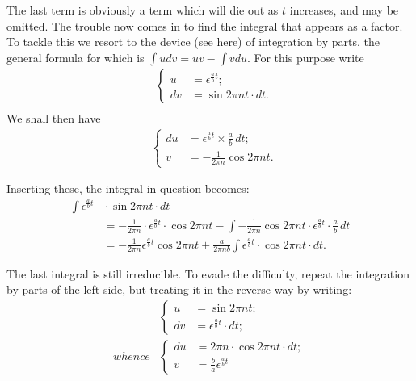 \documentclass{ximera}
\begin{document}
The last term is obviously a term which will die
out as $t$ increases, and may be omitted. The trouble
now comes in to find the integral that appears as a
factor. To tackle this we resort to the device (see
here) of integration by parts, the general formula for
which is $\int u dv = uv - \int v du$. For this purpose write
\begin{align*}
&\left\{
\begin{aligned}
 u &= \epsilon^{\frac{a}{b} t}; \\
dv &= \sin 2\pi nt · dt.
\end{aligned}
\right.  \\
\end{align*}
We shall then have
\begin{align*}
&\left\{
\begin{aligned}
du &= \epsilon^{\frac{a}{b} t} × \frac{a}{b}\, dt; \\
v &= - \frac{1}{2\pi n} \cos 2\pi nt.
\end{aligned}
\right.
\end{align*}


Inserting these, the integral in question becomes:
\begin{align*}
\int \epsilon^{\frac{a}{b} t} &{} · \sin 2 \pi n t · dt \\
&= -\frac{1}{2 \pi n} · \epsilon^{\frac{a}{b} t} · \cos 2 \pi nt
   -\int -\frac{1}{2\pi n} \cos 2 \pi nt · \epsilon^{\frac{a}{b} t} · \frac{a}{b}\, dt \\
&= -\frac{1}{2 \pi n} \epsilon^{\frac{a}{b} t} \cos 2 \pi nt
   +\frac{a}{2 \pi nb} \int \epsilon^{\frac{a}{b} t} · \cos 2 \pi nt · dt.
\tag*{[B]}
\end{align*}

The last integral is still irreducible. To evade the
difficulty, repeat the integration by parts of the left
side, but treating it in the reverse way by writing:
\begin{align*}
&\left\{
\begin{aligned}
u &= \sin 2 \pi n t ; \\
dv &= \epsilon^{\frac{a}{b} t} · dt;
\end{aligned}
\right. \\[1ex]
 whence
&\left\{
  \begin{aligned}
  du &= 2 \pi n · \cos 2 \pi n t · dt; \\
 v &= \frac{b}{a} \epsilon ^{\frac{a}{b} t}
\end{aligned}
\right.
\end{align*}
\end{document}

